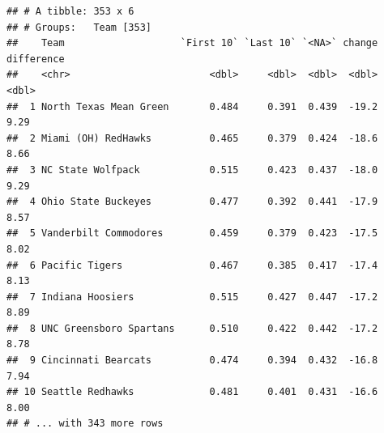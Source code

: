 \documentclass[]{book}
\newenvironment{Shaded}{\begin{snugshade}}{\end{snugshade}}
\newcommand{\KeywordTok}[1]{\textcolor[rgb]{0.13,0.29,0.53}{\textbf{#1}}}
\newcommand{\DataTypeTok}[1]{\textcolor[rgb]{0.13,0.29,0.53}{#1}}
\newcommand{\DecValTok}[1]{\textcolor[rgb]{0.00,0.00,0.81}{#1}}
\newcommand{\StringTok}[1]{\textcolor[rgb]{0.31,0.60,0.02}{#1}}
\newcommand{\OperatorTok}[1]{\textcolor[rgb]{0.81,0.36,0.00}{\textbf{#1}}}
\newcommand{\NormalTok}[1]{#1}
\begin{document}
\begin{Shaded}
\end{Shaded}

\begin{verbatim}
## # A tibble: 353 x 6
## # Groups:   Team [353]
##    Team                    `First 10` `Last 10` `<NA>` change difference
##    <chr>                        <dbl>     <dbl>  <dbl>  <dbl>      <dbl>
##  1 North Texas Mean Green       0.484     0.391  0.439  -19.2       9.29
##  2 Miami (OH) RedHawks          0.465     0.379  0.424  -18.6       8.66
##  3 NC State Wolfpack            0.515     0.423  0.437  -18.0       9.29
##  4 Ohio State Buckeyes          0.477     0.392  0.441  -17.9       8.57
##  5 Vanderbilt Commodores        0.459     0.379  0.423  -17.5       8.02
##  6 Pacific Tigers               0.467     0.385  0.417  -17.4       8.13
##  7 Indiana Hoosiers             0.515     0.427  0.447  -17.2       8.89
##  8 UNC Greensboro Spartans      0.510     0.422  0.442  -17.2       8.78
##  9 Cincinnati Bearcats          0.474     0.394  0.432  -16.8       7.94
## 10 Seattle Redhawks             0.481     0.401  0.431  -16.6       8.00
## # ... with 343 more rows
\end{verbatim}
\end{document}
